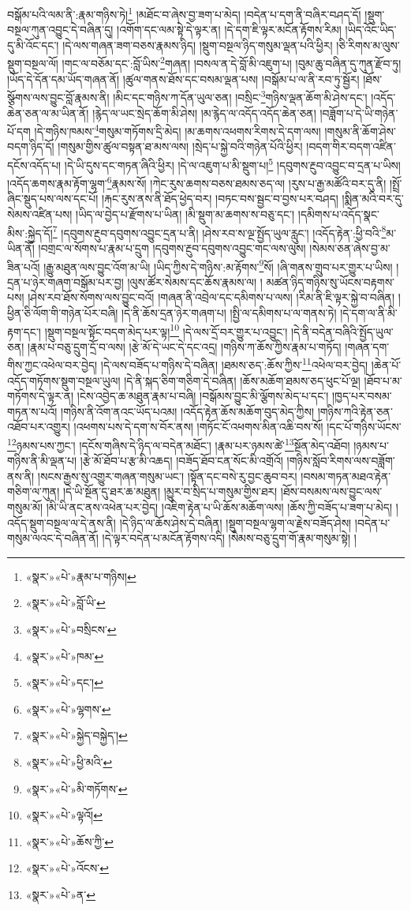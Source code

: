 བསྒོམ་པའི་ལམ་ནི་:རྣམ་གཉིས་ཏེ།\footnote{«སྣར་»«པེ་»རྣམ་པ་གཉིས།} །མཐོང་བ་ཞེས་བྱ་ཟག་པ་མེད། །བདེན་པ་དག་ནི་བཞིར་བཤད་དོ། །སྡུག་བསྔལ་ཀུན་འབྱུང་དེ་བཞིན་དུ། །འགོག་དང་ལམ་སྟེ་དེ་ལྟར་ན། །དེ་དག་ཇི་ལྟར་མངོན་རྟོགས་རིམ། །ཡིད་འོང་ཡིད་དུ་མི་འོང་དང་། །དེ་ལས་གཞན་ཟག་བཅས་རྣམས་ཉིད། །སྡུག་བསྔལ་ཉིད་གསུམ་ལྡན་པའི་ཕྱིར། །ཅི་རིགས་མ་ལུས་སྡུག་བསྔལ་ལོ། །གང་ལ་བཅོམ་དང་:བློ་ཡིས་\footnote{«སྣར་»«པེ་»བློ་ཡི་}གཞན། །བསལ་ན་དེ་བློ་མི་འཇུག་པ། །བུམ་ཆུ་བཞིན་དུ་ཀུན་རྫོབ་ཏུ། །ཡོད་དེ་དོན་དམ་ཡོད་གཞན་ནོ། །ཚུལ་གནས་ཐོས་དང་བསམ་ལྡན་པས། །བསྒོམ་པ་ལ་ནི་རབ་ཏུ་སྦྱོར། །ཐོས་སྩོགས་ལས་བྱུང་བློ་རྣམས་ནི། །མིང་དང་གཉིས་ཀ་དོན་ཡུལ་ཅན། །བསྲིང་\footnote{«སྣར་»«པེ་»བསྲིངས་}གཉིས་ལྡན་ཆོག་མི་ཤེས་དང་། །འདོད་ཆེན་ཅན་ལ་མ་ཡིན་ནོ། །རྙེད་ལ་ཡང་སྲེད་ཆོག་མི་ཤེས། །མ་རྙེད་ལ་འདོད་འདོད་ཆེན་ཅན། །བཟློག་པ་དེ་ཡི་གཉེན་པོ་དག །དེ་གཉིས་ཁམས་\footnote{«སྣར་»«པེ་»ཁམ་}གསུམ་གཏོགས་དྲི་མེད། །མ་ཆགས་འཕགས་རིགས་དེ་དག་ལས། །གསུམ་ནི་ཆོག་ཤེས་བདག་ཉིད་དོ། །གསུམ་གྱིས་ཚུལ་བསྟན་ཐ་མས་ལས། །སྲེད་པ་སྐྱེ་བའི་གཉེན་པོའི་ཕྱིར། །བདག་གིར་བདག་འཛིན་དངོས་འདོད་པ། །དེ་ཡི་དུས་དང་གཏན་ཞིའི་ཕྱིར། །དེ་ལ་འཇུག་པ་མི་སྡུག་པ།\footnote{«སྣར་»«པེ་»དང་།} །དབུགས་རྔུབ་འབྱུང་བ་དྲན་པ་ཡིས། །འདོད་ཆགས་རྣམ་རྟོག་ལྷག་\footnote{«སྣར་»«པེ་»ལྷགས་}རྣམས་སོ། །ཀེང་རུས་ཆགས་བཅས་ཐམས་ཅད་ལ། །རུས་པ་རྒྱ་མཚོའི་བར་དུ་ནི། །སྤྲོ་ཞིང་སྡུད་པས་ལས་དང་པོ། །རྐང་རུས་ནས་ནི་ཐོད་ཕྱེད་བར། །བཏང་བས་སྦྱང་བ་བྱས་པར་བཤད། །སྨིན་མའི་བར་དུ་སེམས་འཛིན་པས། །ཡིད་ལ་བྱེད་པ་རྫོགས་པ་ཡིན། །མི་སྡུག་མ་ཆགས་ས་བཅུ་དང་། །དམིགས་པ་འདོད་སྣང་མིས་:སྐྱེད་དོ།\footnote{«སྣར་»«པེ་»སྐྱེད་བསྐྱེད་།} །དབུགས་རྔུབ་དབུགས་འབྱུང་དྲན་པ་ནི། །ཤེས་རབ་ས་ལྔ་སྤྱོད་ཡུལ་རླུང་། །འདོད་རྟེན་:ཕྱི་བའི་\footnote{«སྣར་»«པེ་»ཕྱི་མའི་}མ་ཡིན་ནོ། །བགྲང་ལ་སོགས་པ་རྣམ་པ་དྲུག །དབུགས་རྔུབ་དབུགས་འབྱུང་གང་ལས་ལུས། །སེམས་ཅན་ཞེས་བྱ་མ་ཟིན་པའོ། །རྒྱུ་མཐུན་ལས་བྱུང་འོག་མ་ཡི། །ཡིད་ཀྱིས་དེ་གཉིས་:མ་རྟོགས་\footnote{«སྣར་»«པེ་»མི་གཏོགས་}སོ། །ཞི་གནས་གྲུབ་པར་གྱུར་པ་ཡིས། །དྲན་པ་ཉེར་གཞག་བསྒོམ་པར་བྱ། །ལུས་ཚོར་སེམས་དང་ཆོས་རྣམས་ལ། །
མཚན་ཉིད་གཉིས་སུ་ཡོངས་བརྟགས་པས། །ཤེས་རབ་ཐོས་སོགས་ལས་བྱུང་བའོ། །གཞན་ནི་འབྲེལ་དང་དམིགས་པ་ལས། །རིམ་ནི་ཇི་ལྟར་སྐྱེ་བ་བཞིན། །ཕྱིན་ཅི་ལོག་གི་གཉེན་པོར་བཞི། །དེ་ནི་ཆོས་དྲན་ཉེར་གཞག་པ། །སྤྱི་ལ་དམིགས་པ་ལ་གནས་ཏེ། །དེ་དག་ལ་ནི་མི་རྟག་དང་། །སྡུག་བསྔལ་སྟོང་བདག་མེད་པར་ལྟ།\footnote{«སྣར་»«པེ་»ལྟའོ།} །དེ་ལས་དྲོ་བར་གྱུར་པ་འབྱུང་། །དེ་ནི་བདེན་བཞིའི་སྤྱོད་ཡུལ་ཅན། །རྣམ་པ་བཅུ་དྲུག་དྲོ་བ་ལས། །རྩེ་མོ་དེ་ཡང་དེ་དང་འདྲ། །གཉིས་ཀ་ཆོས་ཀྱིས་རྣམ་པ་གཏོད། །གཞན་དག་གིས་ཀྱང་འཕེལ་བར་བྱེད། །དེ་ལས་བཟོད་པ་གཉིས་དེ་བཞིན། །ཐམས་ཅད་:ཆོས་ཀྱིས་\footnote{«སྣར་»«པེ་»ཆོས་ཀྱི་}འཕེལ་བར་བྱེད། །ཆེན་པོ་འདོད་གཏོགས་སྡུག་བསྔལ་ཡུལ། །དེ་ནི་སྐད་ཅིག་གཅིག་དེ་བཞིན། །ཆོས་མཆོག་ཐམས་ཅད་ཕུང་པོ་ལྔ། །ཐོབ་པ་མ་གཏོགས་དེ་ལྟར་ན། །ངེས་འབྱེད་ཆ་མཐུན་རྣམ་པ་བཞི། །བསྒོམས་བྱུང་མི་ལྕོགས་མེད་པ་དང་། །ཁྱད་པར་བསམ་གཏན་ས་པའོ། །གཉིས་ནི་འོག་ནའང་ཡོད་པའམ། །འདོད་རྟེན་ཆོས་མཆོག་བུད་མེད་ཀྱིས། །གཉིས་ཀའི་རྟེན་ཅན་འཐོབ་པར་འགྱུར། །འཕགས་པས་དེ་དག་ས་བོར་ནས། །གཏོང་ངོ་འཕགས་མིན་འཆི་བས་སོ། །དང་པོ་གཉིས་ཡོངས་\footnote{«སྣར་»«པེ་»འོངས་}ཉམས་པས་ཀྱང་། །དངོས་གཞིས་དེ་ཉིད་ལ་བདེན་མཐོང་། །རྣམ་པར་ཉམས་ཚེ་\footnote{«སྣར་»«པེ་»ན་}སྔོན་མེད་འཐོབ། །ཉམས་པ་གཉིས་ནི་མི་ལྡན་པ། །རྩེ་མོ་ཐོབ་པ་རྩ་མི་འཆད། །བཟོད་ཐོབ་ངན་སོང་མི་འགྲོའོ། །གཉིས་སློབ་རིགས་ལས་བཟློག་ནས་ནི། །སངས་རྒྱས་སུ་འགྱུར་གཞན་གསུམ་ཡང་། །སྟོན་དང་བསེ་རུ་བྱང་ཆུབ་བར། །བསམ་གཏན་མཐའ་རྟེན་གཅིག་ལ་ཀུན། །དེ་ཡི་སྔོན་དུ་ཐར་ཆ་མཐུན། །མྱུར་བ་སྲིད་པ་གསུམ་གྱིས་ཐར། །ཐོས་བསམས་ལས་བྱུང་ལས་གསུམ་མོ། །མི་ཡི་ནང་ནས་འཕེན་པར་བྱེད། །འཇིག་རྟེན་པ་ཡི་ཆོས་མཆོག་ལས། །ཆོས་ཀྱི་བཟོད་པ་ཟག་པ་མེད། །འདོད་སྡུག་བསྔལ་ལ་དེ་ནས་ནི། །དེ་ཉིད་ལ་ཆོས་ཤེས་དེ་བཞིན། །སྡུག་བསྔལ་ལྷག་ལ་རྗེས་བཟོད་ཤེས། །བདེན་པ་གསུམ་ལའང་དེ་བཞིན་ནོ། །དེ་ལྟར་བདེན་པ་མངོན་རྟོགས་འདི། །སེམས་བཅུ་དྲུག་གོ་རྣམ་གསུམ་སྟེ། །
